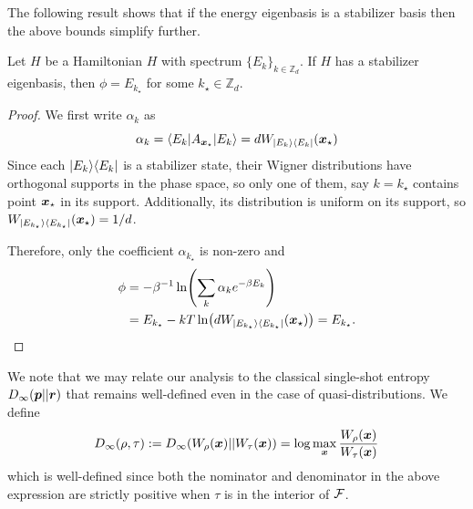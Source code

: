 \documentclass[pra,
aps,
twocolumn,
superscriptaddress,
groupedaddress,
nofootinbib,
reprint
]{revtex4-1}
\begin{document}
The following result shows that if the energy eigenbasis is a stabilizer basis then the above bounds simplify further.
\begin{proposition} \label{sharp-phi}
	Let $H$ be a Hamiltonian $H$ with spectrum $\{E_k\}_{k \in \mathbb{Z}_d}$.
	If $H$ has a stabilizer eigenbasis, then $\phi = E_{k_{\star}}$ for some $k_{\star} \in \mathbb{Z}_d$.
\end{proposition}
\begin{proof}
	We first write $\alpha_k$ as
\begin{equation}
	\alpha_k = \langle E_k | A_{\bm{x}_{\star}} |E_k\rangle = d W_{|E_k\rangle\langle E_k|}(\bm{x}_{\star})
\end{equation}
Since each $|E_k\rangle\langle E_k|$ is a stabilizer state, their Wigner distributions have orthogonal supports in the phase space, so only one of them, say $k = k_{\star}$ contains point $\bm{x}_{\star}$ in its support. 
Additionally, its distribution is uniform on its support, so $W_{|E_{k_\star}\rangle\langle E_{k_\star}|}(\bm{x}_{\star}) = 1/d$.

Therefore, only the coefficient $\alpha_{k_{\star}}$ is non-zero and
\begin{align}
\phi &= -\beta^{-1}\ln (\sum_k \alpha_k e^{-\beta E_k}) \nonumber \\
&=E_{k_{\star}} -kT \ln (d W_{|E_{k_\star}\rangle\langle E_{k_\star}|}(\bm{x}_{\star})) =E_{k_{\star}}.
\end{align}

\end{proof}

We note that we may relate our analysis to the classical single-shot entropy $D_\infty (\boldsymbol{p} ||\boldsymbol{r})$ that remains well-defined even in the case of quasi-distributions. We define 
\begin{equation}
D_\infty(\rho,\tau) := D_\infty(W_\rho(\boldsymbol{x}) || W_\tau (\boldsymbol{x})) =\log  \max_{\boldsymbol{x}} \frac{W_\rho(\boldsymbol{x})}{W_\tau(\boldsymbol{x})}
\end{equation}
which is well-defined since both the nominator and denominator in the above expression are strictly positive when $\tau$ is in the interior of ${\mathcal F}$.
\end{document}
